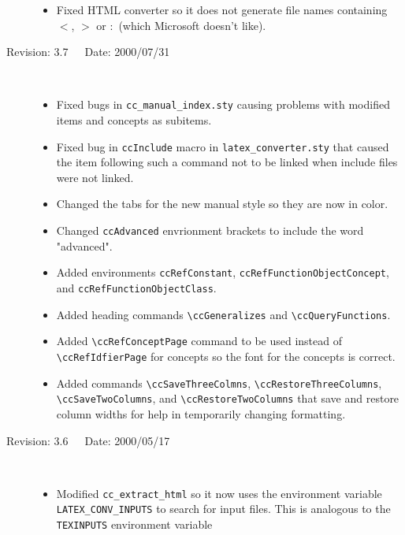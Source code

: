 \documentclass[11pt]{article}
\begin{document}
\begin{description}
\begin{itemize}
        \item Fixed HTML converter so it does not generate file names
              containing $<$, $>$ or $:$ (which Microsoft doesn't like).
    \end{itemize}
    \item[Revision: 3.7~~~Date: 2000/07/31]~\\[-3mm]
    \begin{itemize}
        \item Fixed bugs in {\tt cc\_manual\_index.sty} causing problems with
              modified items and concepts as subitems.
        \item Fixed bug in {\tt ccInclude} macro in {\tt latex\_converter.sty}
              that caused the item following such a command not to be linked
              when include files were not linked.
        \item Changed the tabs for the new manual style so they are now in
              color.
        \item Changed {\tt ccAdvanced} envrionment brackets to include the
              word "advanced".
        \item Added environments {\tt ccRefConstant},
              {\tt ccRefFunctionObjectConcept}, and
              {\tt ccRefFunctionObjectClass}.
        \item Added heading commands \verb|\ccGeneralizes| and
              \verb|\ccQueryFunctions|.
        \item Added \verb|\ccRefConceptPage| command to be used instead of
              \verb|\ccRefIdfierPage| for concepts so the font for the concepts
              is correct.
        \item Added commands \verb|\ccSaveThreeColmns|,
              \verb|\ccRestoreThreeColumns|, \verb|\ccSaveTwoColumns|,
              and \verb|\ccRestoreTwoColumns| that save and restore column
              widths for help in temporarily changing formatting.
    \end{itemize}
    \item[Revision: 3.6~~~Date: 2000/05/17]~\\[-3mm]
    \begin{itemize}
       \item  Modified \verb|cc_extract_html| so it now uses the environment
              variable \verb|LATEX_CONV_INPUTS| to search for input files.
              This is analogous to the \verb|TEXINPUTS| environment variable

\end{itemize}
\end{description}
\end{document}
